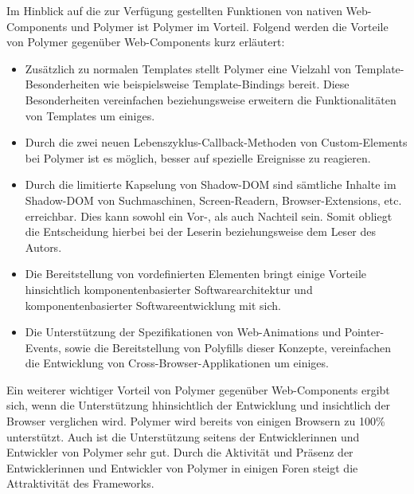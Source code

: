 Im Hinblick auf die zur Verfügung gestellten Funktionen von nativen Web-Components und Polymer ist Polymer im Vorteil. Folgend werden die Vorteile von Polymer gegenüber Web-Components kurz erläutert:
\begin{itemize}
\item Zusätzlich zu normalen Templates stellt Polymer eine Vielzahl von Template-Besonderheiten wie beispielsweise Template-Bindings bereit. Diese Besonderheiten vereinfachen beziehungsweise erweitern die Funktionalitäten von Templates um einiges.
\item Durch die zwei neuen Lebenszyklus-Callback-Methoden von Custom-Elements bei Polymer ist es möglich, besser auf spezielle Ereignisse zu reagieren.
\item Durch die limitierte Kapselung von Shadow-DOM sind sämtliche Inhalte im Shadow-DOM von Suchmaschinen, Screen-Readern, Browser-Extensions, etc. erreichbar. Dies kann sowohl ein Vor-, als auch Nachteil sein. Somit obliegt die Entscheidung hierbei bei der Leserin beziehungsweise dem Leser des Autors.
\item Die Bereitstellung von vordefinierten Elementen bringt einige Vorteile hinsichtlich komponentenbasierter Softwarearchitektur und komponentenbasierter Softwareentwicklung mit sich.
\item Die Unterstützung der Spezifikationen von Web-Animations und Pointer-Events, sowie die Bereitstellung von Polyfills dieser Konzepte, vereinfachen die Entwicklung von Cross-Browser-Applikationen um einiges.
\end{itemize}

Ein weiterer wichtiger Vorteil von Polymer gegenüber Web-Components ergibt sich, wenn die Unterstützung hhinsichtlich der Entwicklung und insichtlich der Browser verglichen wird. Polymer wird bereits von einigen Browsern zu 100\% unterstützt. Auch ist die Unterstützung seitens der Entwicklerinnen und Entwickler von Polymer sehr gut. Durch die Aktivität und Präsenz der Entwicklerinnen und Entwickler von Polymer in einigen Foren steigt die Attraktivität des Frameworks.